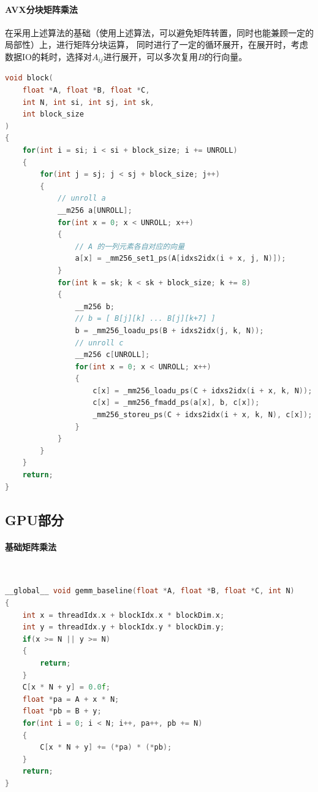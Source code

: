 \documentclass[UTF8]{article}
\begin{document}
    \paragraph*{AVX分块矩阵乘法}
    在采用上述算法的基础（使用上述算法，可以避免矩阵转置，同时也能兼顾一定的局部性）上，进行矩阵分块运算，
    同时进行了一定的循环展开，在展开时，考虑数据IO的耗时，选择对$A_{ij}$进行展开，可以多次复用$B$的行向量。
    \begin{lstlisting}[language=c++]
void block(
    float *A, float *B, float *C,
    int N, int si, int sj, int sk,
    int block_size
)
{
    for(int i = si; i < si + block_size; i += UNROLL)
    {
        for(int j = sj; j < sj + block_size; j++)
        {
            // unroll a
            __m256 a[UNROLL];
            for(int x = 0; x < UNROLL; x++)
            {
                // A 的一列元素各自对应的向量
                a[x] = _mm256_set1_ps(A[idxs2idx(i + x, j, N)]);
            }
            for(int k = sk; k < sk + block_size; k += 8)
            {
                __m256 b;
                // b = [ B[j][k] ... B[j][k+7] ]
                b = _mm256_loadu_ps(B + idxs2idx(j, k, N));
                // unroll c
                __m256 c[UNROLL];
                for(int x = 0; x < UNROLL; x++)
                {
                    c[x] = _mm256_loadu_ps(C + idxs2idx(i + x, k, N));
                    c[x] = _mm256_fmadd_ps(a[x], b, c[x]);
                    _mm256_storeu_ps(C + idxs2idx(i + x, k, N), c[x]);
                }
            }
        }
    }
    return;
}
    \end{lstlisting}
    \subsection{GPU部分}
    \paragraph*{基础矩阵乘法}\mbox{}\\
    \begin{lstlisting}[language=c++]
__global__ void gemm_baseline(float *A, float *B, float *C, int N)
{
    int x = threadIdx.x + blockIdx.x * blockDim.x;
    int y = threadIdx.y + blockIdx.y * blockDim.y;
    if(x >= N || y >= N)
    {
        return;
    }
    C[x * N + y] = 0.0f;
    float *pa = A + x * N;
    float *pb = B + y;
    for(int i = 0; i < N; i++, pa++, pb += N)
    {
        C[x * N + y] += (*pa) * (*pb);
    }
    return;
}
    \end{lstlisting}
\end{document}
